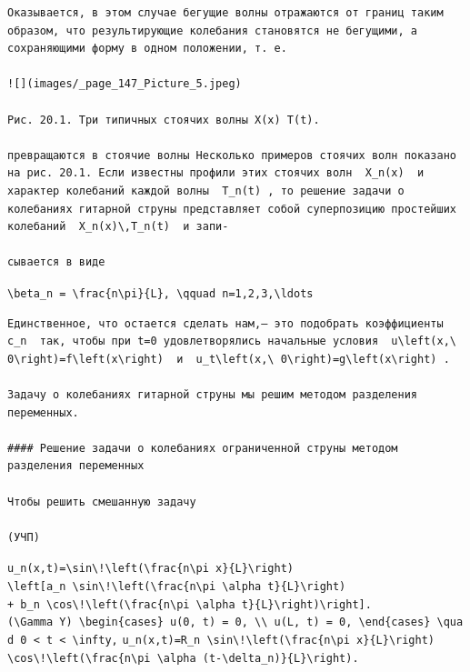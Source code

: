 \documentclass[
  ukrainian,
]{article}
\begin{document}
\begin{verbatim}
Оказывается, в этом случае бегущие волны отражаются от границ таким образом, что результирующие колебания становятся не бегущими, а сохраняющими форму в одном положении, т. е.

![](images/_page_147_Picture_5.jpeg)

Рис. 20.1. Три типичных стоячих волны X(x) T(t).

превращаются в стоячие волны Несколько примеров стоячих волн показано на рис. 20.1. Если известны профили этих стоячих волн  X_n(x)  и характер колебаний каждой волны  T_n(t) , то решение задачи о колебаниях гитарной струны представляет собой суперпозицию простейших колебаний  X_n(x)\,T_n(t)  и запи-

сывается в виде
\end{verbatim}

\texttt{\textbackslash{}beta\_n\ =\ \textbackslash{}frac\{n\textbackslash{}pi\}\{L\},\ \textbackslash{}qquad\ n=1,2,3,\textbackslash{}ldots}

\begin{verbatim}
Единственное, что остается сделать нам,— это подобрать коэффициенты  c_n  так, чтобы при t=0 удовлетворялись начальные условия  u\left(x,\ 0\right)=f\left(x\right)  и  u_t\left(x,\ 0\right)=g\left(x\right) .

Задачу о колебаниях гитарной струны мы решим методом разделения переменных.

#### Решение задачи о колебаниях ограниченной струны методом разделения переменных

Чтобы решить смешанную задачу

(УЧП)
\end{verbatim}

\texttt{u\_n(x,t)=\textbackslash{}sin\textbackslash{}!\textbackslash{}left(\textbackslash{}frac\{n\textbackslash{}pi\ x\}\{L\}\textbackslash{}right)}
\texttt{\textbackslash{}left{[}a\_n\ \textbackslash{}sin\textbackslash{}!\textbackslash{}left(\textbackslash{}frac\{n\textbackslash{}pi\ \textbackslash{}alpha\ t\}\{L\}\textbackslash{}right)}
\texttt{+\ b\_n\ \textbackslash{}cos\textbackslash{}!\textbackslash{}left(\textbackslash{}frac\{n\textbackslash{}pi\ \textbackslash{}alpha\ t\}\{L\}\textbackslash{}right)\textbackslash{}right{]}.}
\texttt{(\textbackslash{}Gamma\ Y)\ \textbackslash{}begin\{cases\}\ u(0,\ t)\ =\ 0,\ \textbackslash{}\textbackslash{}\ u(L,\ t)\ =\ 0,\ \textbackslash{}end\{cases\}\ \textbackslash{}quad\ 0\ \textless{}\ t\ \textless{}\ \textbackslash{}infty,}
\texttt{u\_n(x,t)=R\_n\ \textbackslash{}sin\textbackslash{}!\textbackslash{}left(\textbackslash{}frac\{n\textbackslash{}pi\ x\}\{L\}\textbackslash{}right)}
\texttt{\textbackslash{}cos\textbackslash{}!\textbackslash{}left(\textbackslash{}frac\{n\textbackslash{}pi\ \textbackslash{}alpha\ (t-\textbackslash{}delta\_n)\}\{L\}\textbackslash{}right).}
\end{document}
